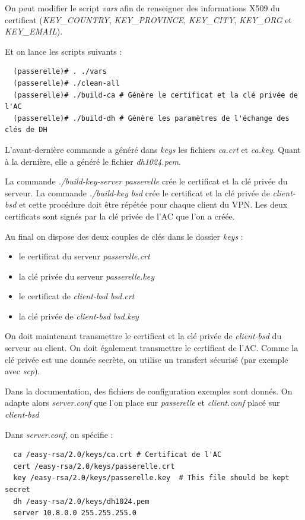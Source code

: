 \documentclass[a4paper]{article}
\begin{document}
On peut modifier le script \textit{vars} afin de renseigner des informations X509 du
certificat (\textit{KEY\_COUNTRY}, \textit{KEY\_PROVINCE}, \textit{KEY\_CITY}, 
\textit{KEY\_ORG} et \textit{KEY\_EMAIL}).

Et on lance les scripts suivants :
\begin{verbatim}
  (passerelle)# . ./vars
  (passerelle)# ./clean-all
  (passerelle)# ./build-ca # Génère le certificat et la clé privée de l'AC
  (passerelle)# ./build-dh # Génère les paramètres de l'échange des clés de DH
\end{verbatim}

L'avant-dernière commande a généré dans \textit{keys} les fichiers \textit{ca.crt}
et \textit{ca.key}. Quant à la dernière, elle a généré le fichier \textit{dh1024.pem}.

La commande \textit{./build-key-server passerelle} crée le certificat et la clé privée du serveur.
La commande \textit{./build-key bsd} crée le certificat et la clé privée de \textit{client-bsd} et
cette procédure doit être répétée pour chaque client du VPN.
Les deux certificats sont signés par la clé privée de l'AC que l'on a créée.

Au final on dispose des deux couples de clés dans le dossier \textit{keys} :
\begin{itemize}
  \item le certificat du serveur \textit{passerelle.crt}
  \item la clé privée du serveur \textit{passerelle.key}
  \item le certificat de \textit{client-bsd} \textit{bsd.crt}
  \item la clé privée de \textit{client-bsd} \textit{bsd.key}
\end{itemize}

On doit maintenant transmettre le certificat et la clé privée de \textit{client-bsd}
du serveur au client. On doit également transmettre le certificat de l'AC. 
Comme la clé privée est une donnée secrète, on utilise
un transfert sécurisé (par exemple avec \textit{scp}).

Dans la documentation, des fichiers de configuration exemples sont donnés.
On adapte alors \textit{server.conf} que l'on place sur \textit{passerelle}
et \textit{client.conf} placé sur \textit{client-bsd}

Dans \textit{server.conf}, on spécifie :
\begin{verbatim}
  ca /easy-rsa/2.0/keys/ca.crt # Certificat de l'AC
  cert /easy-rsa/2.0/keys/passerelle.crt
  key /easy-rsa/2.0/keys/passerelle.key  # This file should be kept secret
  dh /easy-rsa/2.0/keys/dh1024.pem
  server 10.8.0.0 255.255.255.0 
\end{verbatim}
\end{document}
